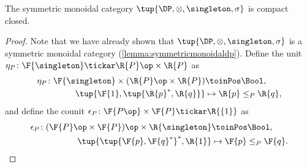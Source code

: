 \begin{lemma}
The symmetric monoidal category $\tup{\DP,\otimes,\singleton,\sigma}$ is compact closed.
\end{lemma}
\begin{proof}
Note that we have already shown that $\tup{\DP,\otimes,\singleton,\sigma}$ is a symmetric monoidal category (\cref{lemma:symmetricmonoidaldp}). Define the unit $\eta_P\colon \F{\singleton} \tickar \R{P}\op \times \R{P} $ as
\begin{equation}
\label{eqn:unit_morphism}
\begin{aligned}
    \eta_P \colon \F{\singleton} \times (\R{P}\op \times \R{P}) & \toinPos \Bool, \\
            \tup{\F{1},\tup{\R{p}^*,\R{q}}} & \mapsto \R{p} \leq_P \R{q},
\end{aligned}
\end{equation}
and define the counit $\epsilon_P\colon \F{P\op} \times \F{P} \tickar \R{\{1\}} $ as
\begin{equation}
\begin{aligned}
    \epsilon_P \colon (\F{P}\op \times \F{P})\op \times \R{\singleton} & \toinPos \Bool,  \\
            \tup{\tup{\F{p},\F{q}^*}^*, \R{1}} & \mapsto \F{p} \leq_P \F{q}.
\end{aligned}
\end{equation}


\end{proof}
